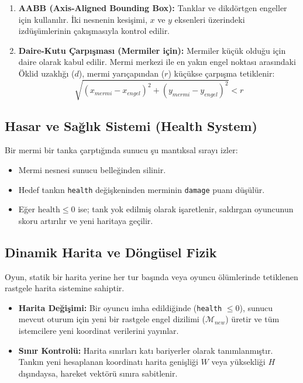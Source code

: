\documentclass[12pt,a4paper]{article}
\begin{document}
\begin{enumerate}
      \item \textbf{AABB (Axis-Aligned Bounding Box):} Tanklar ve dikdörtgen engeller için kullanılır. İki nesnenin kesişimi, $x$ ve $y$ eksenleri üzerindeki izdüşümlerinin çakışmasıyla kontrol edilir.
      \item \textbf{Daire-Kutu Çarpışması (Mermiler için):} Mermiler küçük olduğu için daire olarak kabul edilir. Mermi merkezi ile en yakın engel noktası arasındaki Öklid uzaklığı ($d$), mermi yarıçapından ($r$) küçükse çarpışma tetiklenir:
            \[ \sqrt{(x_{mermi} - x_{engel})^2 + (y_{mermi} - y_{engel})^2} < r \]
\end{enumerate}


\subsection{Hasar ve Sağlık Sistemi (Health System)}
Bir mermi bir tanka çarptığında sunucu şu mantıksal sırayı izler:
\begin{itemize}
      \item Mermi nesnesi sunucu belleğinden silinir.
      \item Hedef tankın \texttt{health} değişkeninden merminin \texttt{damage} puanı düşülür.
      \item Eğer $\text{health} \leq 0$ ise; tank yok edilmiş olarak işaretlenir, saldırgan oyuncunun skoru artırılır ve yeni haritaya geçilir.
\end{itemize}


\subsection{Dinamik Harita ve Döngüsel Fizik}
Oyun, statik bir harita yerine her tur başında veya oyuncu ölümlerinde tetiklenen rastgele harita sistemine sahiptir.

\begin{itemize}
      \item \textbf{Harita Değişimi:} Bir oyuncu imha edildiğinde (\texttt{health} $\leq 0$), sunucu mevcut oturum için yeni bir rastgele engel dizilimi ($\mathcal{M}_{new}$) üretir ve tüm istemcilere yeni koordinat verilerini yayınlar.
      \item \textbf{Sınır Kontrolü:} Harita sınırları katı bariyerler olarak tanımlanmıştır. Tankın yeni hesaplanan koordinatı harita genişliği $W$ veya yüksekliği $H$ dışındaysa, hareket vektörü sınıra sabitlenir.
\end{itemize}
\end{document}
